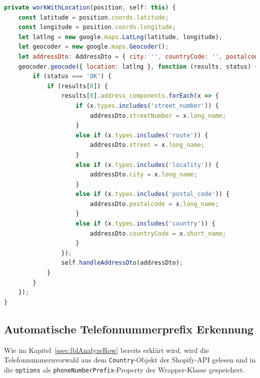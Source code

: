 \begin{lstlisting}[caption={Die \texttt{workWithLocation()}-Methode der \texttt{StreetComponent}-Klasse}, language=JavaScript,label={lst:workWithLocation}]
private workWithLocation(position, self: this) {
	const latitude = position.coords.latitude;
	const longitude = position.coords.longitude;
	let latlng = new google.maps.LatLng(latitude, longitude);
	let geocoder = new google.maps.Geocoder();
	let addressDto: AddressDto = { city: '', countryCode: '', postalcode: '', street: '', streetNumber: '' };
	geocoder.geocode({ location: latlng }, function (results, status) {
		if (status === 'OK') {
			if (results[0]) {
				results[0].address_components.forEach(x => {
					if (x.types.includes('street_number')) {
						addressDto.streetNumber = x.long_name;
					}
					else if (x.types.includes('route')) {
						addressDto.street = x.long_name;
					}
					else if (x.types.includes('locality')) {
						addressDto.city = x.long_name;
					}
					else if (x.types.includes('postal_code')) {
						addressDto.postalcode = x.long_name;
					}
					else if (x.types.includes('country')) {
						addressDto.countryCode = x.short_name;
					}
				});
				self.handleAddressDto(addressDto);
			}
		}
	});
}
\end{lstlisting}

\subsection{Automatische Telefonnummerprefix Erkennung}

Wie im Kapitel~\ref{ssec:lblAnalyzeRow} bereits erklärt wird, wird die Telefonnummernvorwahl aus dem \texttt{Country}-Objekt der Shopify-API gelesen und in die \texttt{options} als \texttt{phoneNumberPrefix}-Property der Wrapper-Klasse gespeichert.